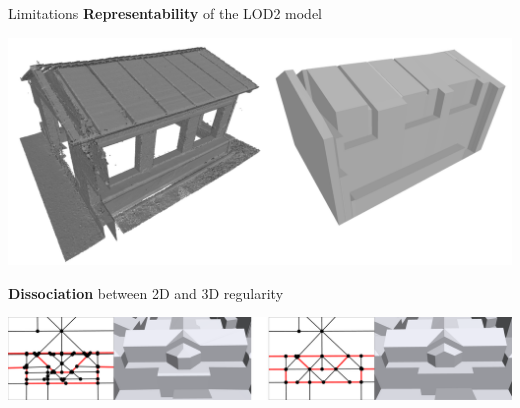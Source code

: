 \begin{frame}{Limitations}
	\small
	\textbf{Representability} of the LOD2 model
	\begin{center}
		\includegraphics[width=0.8\linewidth]{failure_case}
	\end{center}

	\textbf{Dissociation} between 2D and 3D regularity
	\begin{center}
		\includegraphics[width=0.8\linewidth]{closeup_v2}
	\end{center}
\end{frame}
